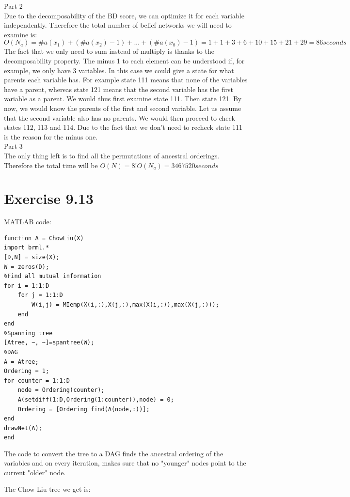 \documentclass[11pt,a4paper,oneside]{report}
\begin{document}
Part 2\\
Due to the decomposability of the BD score, we can optimize it for each variable independently. Therefore the total number of belief networks we will need to examine is:
$$O(N_a)=\#a(x_1) + (\#a(x_2)-1)+...+(\#a(x_8)-1)= 1+1+3+6+10+15+21+29=86 seconds$$
The fact that we only need to sum instead of multiply is thanks to the decomposability property. The minus 1 to each element can be understood if, for example, we only have 3 variables. In this case we could give a state for what parents each variable has. For example state 111 means that none of the variables have a parent, whereas state 121 means that the second variable has the first variable as a parent. We would thus first examine state 111. Then state 121. By now, we would know the parents of the first and second variable. Let us assume that the second variable also has no parents. We would then proceed to check states 112, 113 and 114. Due to the fact that we don't need to recheck state 111 is the reason for the minus one.\\

Part 3\\
The only thing left is to find all the permutations of ancestral orderings. Therefore the total time will be $O(N) = 8!O(N_a)=3467520 seconds$

\section*{Exercise 9.13}

MATLAB code:
\begin{lstlisting}
function A = ChowLiu(X)
import brml.*
[D,N] = size(X);
W = zeros(D);
%Find all mutual information
for i = 1:1:D
    for j = 1:1:D
        W(i,j) = MIemp(X(i,:),X(j,:),max(X(i,:)),max(X(j,:)));
    end
end
%Spanning tree
[Atree, ~, ~]=spantree(W);
%DAG
A = Atree;
Ordering = 1;
for counter = 1:1:D
    node = Ordering(counter);
    A(setdiff(1:D,Ordering(1:counter)),node) = 0;
    Ordering = [Ordering find(A(node,:))];
end
drawNet(A);
end
\end{lstlisting}

The code to convert the tree to a DAG finds the ancestral ordering of the variables and on every iteration, makes sure that no "younger" nodes point to the current "older" node.

The Chow Liu tree we get is:
\end{document}
